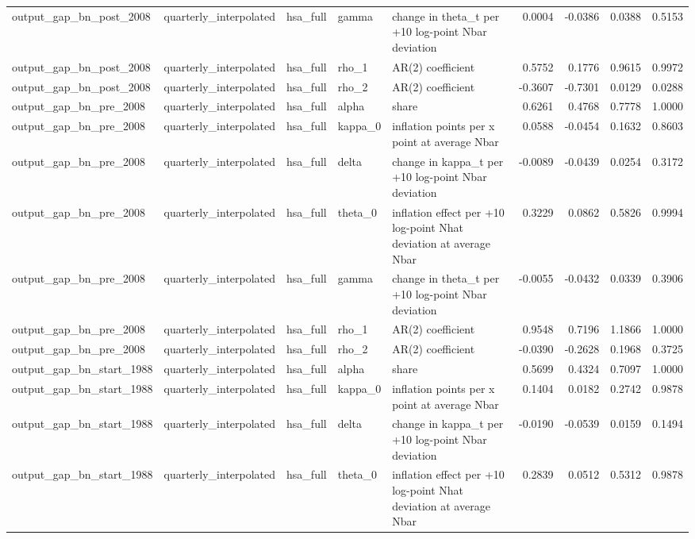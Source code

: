 \begin{tabular}{lllllrrrr}
output\_gap\_bn\_post\_2008 & quarterly\_interpolated & hsa\_full & gamma & change in theta\_t per +10 log-point Nbar deviation & 0.0004 & -0.0386 & 0.0388 & 0.5153 \\
output\_gap\_bn\_post\_2008 & quarterly\_interpolated & hsa\_full & rho\_1 & AR(2) coefficient & 0.5752 & 0.1776 & 0.9615 & 0.9972 \\
output\_gap\_bn\_post\_2008 & quarterly\_interpolated & hsa\_full & rho\_2 & AR(2) coefficient & -0.3607 & -0.7301 & 0.0129 & 0.0288 \\
output\_gap\_bn\_pre\_2008 & quarterly\_interpolated & hsa\_full & alpha & share & 0.6261 & 0.4768 & 0.7778 & 1.0000 \\
output\_gap\_bn\_pre\_2008 & quarterly\_interpolated & hsa\_full & kappa\_0 & inflation points per x point at average Nbar & 0.0588 & -0.0454 & 0.1632 & 0.8603 \\
output\_gap\_bn\_pre\_2008 & quarterly\_interpolated & hsa\_full & delta & change in kappa\_t per +10 log-point Nbar deviation & -0.0089 & -0.0439 & 0.0254 & 0.3172 \\
output\_gap\_bn\_pre\_2008 & quarterly\_interpolated & hsa\_full & theta\_0 & inflation effect per +10 log-point Nhat deviation at average Nbar & 0.3229 & 0.0862 & 0.5826 & 0.9994 \\
output\_gap\_bn\_pre\_2008 & quarterly\_interpolated & hsa\_full & gamma & change in theta\_t per +10 log-point Nbar deviation & -0.0055 & -0.0432 & 0.0339 & 0.3906 \\
output\_gap\_bn\_pre\_2008 & quarterly\_interpolated & hsa\_full & rho\_1 & AR(2) coefficient & 0.9548 & 0.7196 & 1.1866 & 1.0000 \\
output\_gap\_bn\_pre\_2008 & quarterly\_interpolated & hsa\_full & rho\_2 & AR(2) coefficient & -0.0390 & -0.2628 & 0.1968 & 0.3725 \\
output\_gap\_bn\_start\_1988 & quarterly\_interpolated & hsa\_full & alpha & share & 0.5699 & 0.4324 & 0.7097 & 1.0000 \\
output\_gap\_bn\_start\_1988 & quarterly\_interpolated & hsa\_full & kappa\_0 & inflation points per x point at average Nbar & 0.1404 & 0.0182 & 0.2742 & 0.9878 \\
output\_gap\_bn\_start\_1988 & quarterly\_interpolated & hsa\_full & delta & change in kappa\_t per +10 log-point Nbar deviation & -0.0190 & -0.0539 & 0.0159 & 0.1494 \\
output\_gap\_bn\_start\_1988 & quarterly\_interpolated & hsa\_full & theta\_0 & inflation effect per +10 log-point Nhat deviation at average Nbar & 0.2839 & 0.0512 & 0.5312 & 0.9878 \\

\end{tabular}
